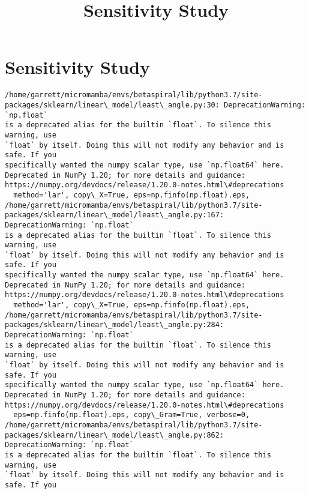 \documentclass[11pt]{article}
\title{Sensitivity Study}
\begin{document}
    
    \maketitle
    
    

    
    \hypertarget{sensitivity-study}{%
\section{Sensitivity Study}\label{sensitivity-study}}

    \begin{Verbatim}[commandchars=\\\{\}]
/home/garrett/micromamba/envs/betaspiral/lib/python3.7/site-
packages/sklearn/linear\_model/least\_angle.py:30: DeprecationWarning: `np.float`
is a deprecated alias for the builtin `float`. To silence this warning, use
`float` by itself. Doing this will not modify any behavior and is safe. If you
specifically wanted the numpy scalar type, use `np.float64` here.
Deprecated in NumPy 1.20; for more details and guidance:
https://numpy.org/devdocs/release/1.20.0-notes.html\#deprecations
  method='lar', copy\_X=True, eps=np.finfo(np.float).eps,
/home/garrett/micromamba/envs/betaspiral/lib/python3.7/site-
packages/sklearn/linear\_model/least\_angle.py:167: DeprecationWarning: `np.float`
is a deprecated alias for the builtin `float`. To silence this warning, use
`float` by itself. Doing this will not modify any behavior and is safe. If you
specifically wanted the numpy scalar type, use `np.float64` here.
Deprecated in NumPy 1.20; for more details and guidance:
https://numpy.org/devdocs/release/1.20.0-notes.html\#deprecations
  method='lar', copy\_X=True, eps=np.finfo(np.float).eps,
/home/garrett/micromamba/envs/betaspiral/lib/python3.7/site-
packages/sklearn/linear\_model/least\_angle.py:284: DeprecationWarning: `np.float`
is a deprecated alias for the builtin `float`. To silence this warning, use
`float` by itself. Doing this will not modify any behavior and is safe. If you
specifically wanted the numpy scalar type, use `np.float64` here.
Deprecated in NumPy 1.20; for more details and guidance:
https://numpy.org/devdocs/release/1.20.0-notes.html\#deprecations
  eps=np.finfo(np.float).eps, copy\_Gram=True, verbose=0,
/home/garrett/micromamba/envs/betaspiral/lib/python3.7/site-
packages/sklearn/linear\_model/least\_angle.py:862: DeprecationWarning: `np.float`
is a deprecated alias for the builtin `float`. To silence this warning, use
`float` by itself. Doing this will not modify any behavior and is safe. If you

\end{Verbatim}
\end{document}
